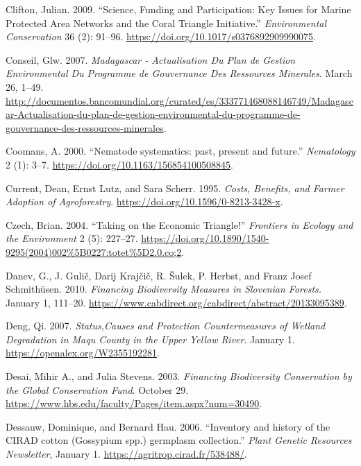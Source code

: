 \begin{CSLReferences}{1}{1}
Clifton, Julian. 2009. {``Science, Funding and Participation: Key Issues
for Marine Protected Area Networks and the Coral Triangle Initiative.''}
\emph{Environmental Conservation} 36 (2): 91--96.
\url{https://doi.org/10.1017/s0376892909990075}.

Conseil, Glw. 2007. \emph{Madagascar - Actualisation Du Plan de Gestion
Environmental Du Programme de Gouvernance Des Ressources Minerales}.
March 26, 1--49.
\url{http://documentos.bancomundial.org/curated/es/333771468088146749/Madagascar-Actualisation-du-plan-de-gestion-environmental-du-programme-de-gouvernance-des-ressources-minerales}.

Coomans, A. 2000. {``Nematode systematics: past, present and future.''}
\emph{Nematology} 2 (1): 3--7.
\url{https://doi.org/10.1163/156854100508845}.

Current, Dean, Ernst Lutz, and Sara Scherr. 1995. \emph{Costs, Benefits,
and Farmer Adoption of Agroforestry}.
\url{https://doi.org/10.1596/0-8213-3428-x}.

Czech, Brian. 2004. {``Taking on the Economic Triangle!''}
\emph{Frontiers in Ecology and the Environment} 2 (5): 227--27.
\url{https://doi.org/10.1890/1540-9295(2004)002\%5B0227:totet\%5D2.0.co;2}.

Danev, G., J. Gulič, Darij Krajčič, R. Šulek, P. Herbst, and Franz Josef
Schmithüsen. 2010. \emph{Financing Biodiversity Measures in Slovenian
Forests.} January 1, 111--20.
\url{https://www.cabdirect.org/cabdirect/abstract/20133095389}.

Deng, Qi. 2007. \emph{Status,Causes and Protection Countermeasures of
Wetland Degradation in Maqu County in the Upper Yellow River}. January
1. \url{https://openalex.org/W2355192281}.

Desai, Mihir A., and Julia Stevens. 2003. \emph{Financing Biodiversity
Conservation by the Global Conservation Fund}. October 29.
\url{https://www.hbs.edu/faculty/Pages/item.aspx?num=30490}.

Dessauw, Dominique, and Bernard Hau. 2006. {``Inventory and history of
the CIRAD cotton (Gossypium spp.) germplasm collection.''} \emph{Plant
Genetic Resources Newsletter}, January 1.
\url{https://agritrop.cirad.fr/538488/}.


\end{CSLReferences}
